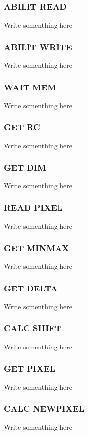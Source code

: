 \documentclass{article}
\begin{document}
\subsubsection{ABILIT READ}
Write somenthing here

\subsubsection{ABILIT WRITE}
Write somenthing here

\subsubsection{WAIT MEM}
Write somenthing here

\subsubsection{GET RC}
Write somenthing here

\subsubsection{GET DIM}
Write somenthing here

\subsubsection{READ PIXEL}
Write somenthing here

\subsubsection{GET MINMAX}
Write somenthing here

\subsubsection{GET DELTA}
Write somenthing here

\subsubsection{CALC SHIFT}
Write somenthing here

\subsubsection{GET PIXEL}
Write somenthing here

\subsubsection{CALC NEWPIXEL}
Write somenthing here
\end{document}
